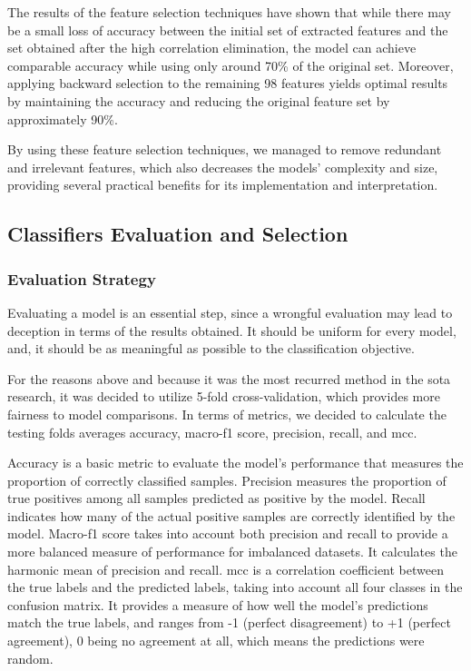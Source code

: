The results of the feature selection techniques have shown that while there may be a small loss of accuracy between the initial set of extracted features and the set obtained after the high correlation elimination, the model can achieve comparable accuracy while using only around 70\% of the original set. Moreover, applying backward selection to the remaining 98 features yields optimal results by maintaining the accuracy and reducing the original feature set by approximately 90\%.

By using these feature selection techniques, we managed to remove redundant and irrelevant features, which also decreases the models' complexity and size, providing several practical benefits for its implementation and interpretation.


\subsection{Classifiers Evaluation and Selection}

\subsubsection{Evaluation Strategy}

Evaluating a model is an essential step, since a wrongful evaluation may lead to deception in terms of the results obtained. It should be uniform for every model, and, it should be as meaningful as possible to the classification objective.

For the reasons above and because it was the most recurred method in the \ac{sota} research, it was decided to utilize 5-fold cross-validation, which provides more fairness to model comparisons. In terms of metrics, we decided to calculate the testing folds averages accuracy, macro-f1 score, precision, recall, and \ac{mcc}.

Accuracy is a basic metric to evaluate the model's performance that measures the proportion of correctly classified samples. Precision measures the proportion of true positives among all samples predicted as positive by the model. Recall indicates how many of the actual positive samples are correctly identified by the model. Macro-f1 score takes into account both precision and recall to provide a more balanced measure of performance for imbalanced datasets. It calculates the harmonic mean of precision and recall. \ac{mcc} is a correlation coefficient between the true labels and the predicted labels, taking into account all four classes in the confusion matrix. It provides a measure of how well the model's predictions match the true labels, and ranges from -1 (perfect disagreement) to +1 (perfect agreement), 0 being no agreement at all, which means the predictions were random.

